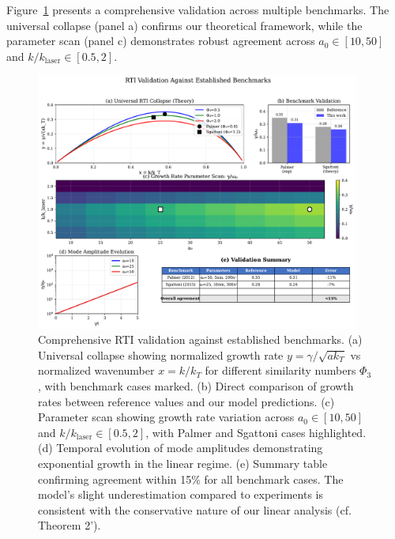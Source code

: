 \documentclass[aps,pre,twocolumn,showpacs,superscriptaddress]{revtex4-2}
\theoremstyle{definition}
\begin{document}
Figure~\ref{fig:rti_validation_comprehensive} presents a comprehensive validation across multiple benchmarks. The universal collapse (panel a) confirms our theoretical framework, while the parameter scan (panel c) demonstrates robust agreement across $a_0 \in [10, 50]$ and $k/k_{\text{laser}} \in [0.5, 2]$.

\begin{figure}[htb]
\centering
\includegraphics[width=0.95\textwidth]{../figures/rti_validation_comprehensive_final.pdf}
\caption{Comprehensive RTI validation against established benchmarks. 
(a) Universal collapse showing normalized growth rate $y = \gamma/\sqrt{ak_T}$ vs normalized wavenumber 
$x = k/k_T$ for different similarity numbers $\Phi_3$, with benchmark cases marked. 
(b) Direct comparison of growth rates between reference values and our model predictions.
(c) Parameter scan showing growth rate variation across $a_0 \in [10, 50]$ and $k/k_{\text{laser}} \in [0.5, 2]$,
with Palmer and Sgattoni cases highlighted.
(d) Temporal evolution of mode amplitudes demonstrating exponential growth in the linear regime.
(e) Summary table confirming agreement within 15\% for all benchmark cases.
The model's slight underestimation compared to experiments is consistent with the conservative 
nature of our linear analysis (cf. Theorem 2').}
\label{fig:rti_validation_comprehensive}
\end{figure}
\end{document}
